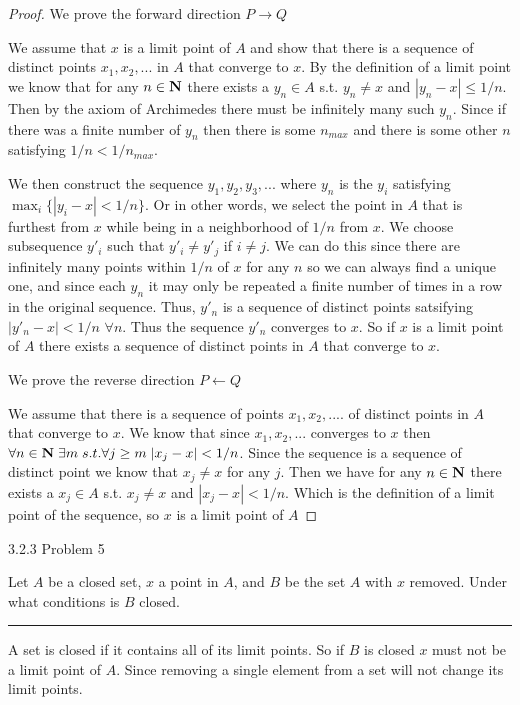 \documentclass[11pt]{article}
\begin{document}
\begin{proof}

We prove the forward direction $P \to Q$

We assume that $x$ is a limit point of $A$ and show that there is a sequence of distinct points $x_1, x_2, ...$ in $A$ that converge to $x$. By the definition of a limit point we know that for any $n \in \mathbf{N}$ there exists a $y_n \in A$ s.t. $y_n \neq x$ and $|y_n - x| \leq 1/n$. Then by the axiom of Archimedes there must be infinitely many such $y_n$. Since if there was a finite number of $y_n$ then there is some $n_{max}$ and there is some other $n$ satisfying $1/n < 1/n_{max}$. 

We then construct the sequence $y_1, y_2, y_3, ...$ where $y_n$ is the $y_i$ satisfying $\max_{i}\{|y_i - x| < 1/n \}$. Or in other words, we select the point in $A$ that is furthest from $x$ while being in a neighborhood of $1/n$ from $x$. We choose subsequence $y'_i$ such that $y'_i \neq y'_j$ if $i \neq j$. We can do this since there are infinitely many points within $1/n$ of $x$ for any $n$ so we can always find a unique one, and since each $y_n$ it may only be repeated a finite number of times in a row in the original sequence. Thus, $y'_n$ is a sequence of distinct points satsifying $|y'_n - x| < 1/n$ $\forall n$. Thus the sequence $y'_n$ converges to $x$. So if $x$ is a limit point of $A$ there exists a sequence of distinct points in $A$ that converge to $x$.


We prove the reverse direction $P \gets Q$

We assume that there is a sequence of points $x_1, x_2, ....$ of distinct points in $A$ that converge to $x$. We know that since $x_1, x_2, ...$ converges to $x$ then $\forall n \in \mathbf{N} \; \exists m \; s.t. \forall j \geq m \; |x_j - x| < 1/n$. 
Since the sequence is a sequence of distinct point we know that $x_j \neq x$ for any $j$. Then we have for any $n \in \mathbf{N}$ there exists a $x_j \in A$ s.t. $x_j \neq x$ and $|x_j - x| < 1/n$.
Which is the definition of a limit point of the sequence, so $x$ is a limit point of $A$

\end{proof}


\newpage
{} 3.2.3 Problem 5

Let $A$ be a closed set, $x$ a point in $A$, and $B$ be the set $A$ with $x$ removed. Under what conditions is $B$ closed. 

\hrule

A set is closed if it contains all of its limit points. So if $B$ is closed $x$ must not be a limit point of $A$. Since removing a single element from a set will not change its limit points. 
\end{document}
